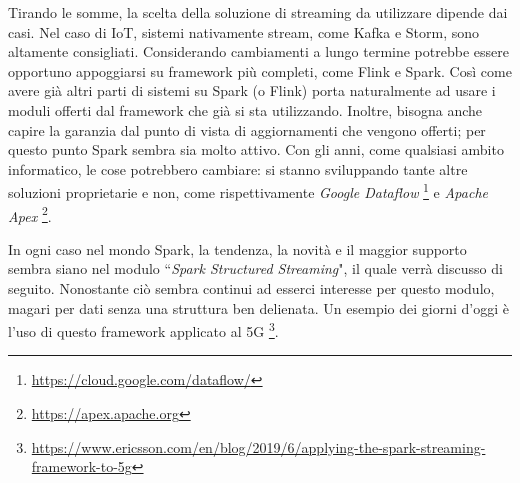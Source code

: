 \documentclass[12pt,italian]{article}
\begin{document}
Tirando le somme, la scelta della soluzione di streaming da utilizzare dipende dai casi. Nel caso di IoT, sistemi nativamente stream, come Kafka e Storm, sono altamente consigliati. Considerando cambiamenti a lungo termine potrebbe essere opportuno appoggiarsi su framework più completi, come Flink e Spark. Così come avere già altri parti di sistemi su Spark (o Flink) porta naturalmente ad usare i moduli offerti dal framework che già si sta utilizzando.
Inoltre, bisogna anche capire la garanzia dal punto di vista di aggiornamenti che vengono offerti; per questo punto Spark sembra sia molto attivo.
Con gli anni, come qualsiasi ambito informatico, le cose potrebbero cambiare: si stanno sviluppando tante altre soluzioni proprietarie e non, come rispettivamente \textit{Google Dataflow} \footnote{\url{https://cloud.google.com/dataflow/}} e \textit{Apache Apex} \footnote{\url{https://apex.apache.org}}.

\par In ogni caso nel mondo Spark, la tendenza, la novità e il maggior supporto sembra siano nel modulo ``\textit{Spark Structured Streaming}", il quale verrà discusso di seguito.
Nonostante ciò sembra continui ad esserci interesse per questo modulo, magari per dati senza una struttura ben delienata. Un esempio dei giorni d'oggi è l'uso di questo framework applicato al 5G \footnote{\url{https://www.ericsson.com/en/blog/2019/6/applying-the-spark-streaming-framework-to-5g}}.
\end{document}
